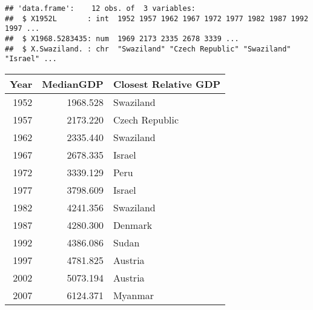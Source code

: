 \documentclass[
]{article}
\newenvironment{Shaded}{\begin{snugshade}}{\end{snugshade}}
\newcommand{\ControlFlowTok}[1]{\textcolor[rgb]{0.13,0.29,0.53}{\textbf{#1}}}
\newcommand{\KeywordTok}[1]{\textcolor[rgb]{0.13,0.29,0.53}{\textbf{#1}}}
\newcommand{\NormalTok}[1]{#1}
\newcommand{\OperatorTok}[1]{\textcolor[rgb]{0.81,0.36,0.00}{\textbf{#1}}}
\newcommand{\StringTok}[1]{\textcolor[rgb]{0.31,0.60,0.02}{#1}}
\begin{document}
\begin{Shaded}
\end{Shaded}

\begin{verbatim}
## 'data.frame':    12 obs. of  3 variables:
##  $ X1952L       : int  1952 1957 1962 1967 1972 1977 1982 1987 1992 1997 ...
##  $ X1968.5283435: num  1969 2173 2335 2678 3339 ...
##  $ X.Swaziland. : chr  "Swaziland" "Czech Republic" "Swaziland" "Israel" ...
\end{verbatim}

\begin{longtable}[]{@{}rrl@{}}
\toprule
Year & MedianGDP & Closest Relative GDP\tabularnewline
\midrule
\endhead
1952 & 1968.528 & Swaziland\tabularnewline
1957 & 2173.220 & Czech Republic\tabularnewline
1962 & 2335.440 & Swaziland\tabularnewline
1967 & 2678.335 & Israel\tabularnewline
1972 & 3339.129 & Peru\tabularnewline
1977 & 3798.609 & Israel\tabularnewline
1982 & 4241.356 & Swaziland\tabularnewline
1987 & 4280.300 & Denmark\tabularnewline
1992 & 4386.086 & Sudan\tabularnewline
1997 & 4781.825 & Austria\tabularnewline
2002 & 5073.194 & Austria\tabularnewline
2007 & 6124.371 & Myanmar\tabularnewline
\bottomrule
\end{longtable}
\end{document}
